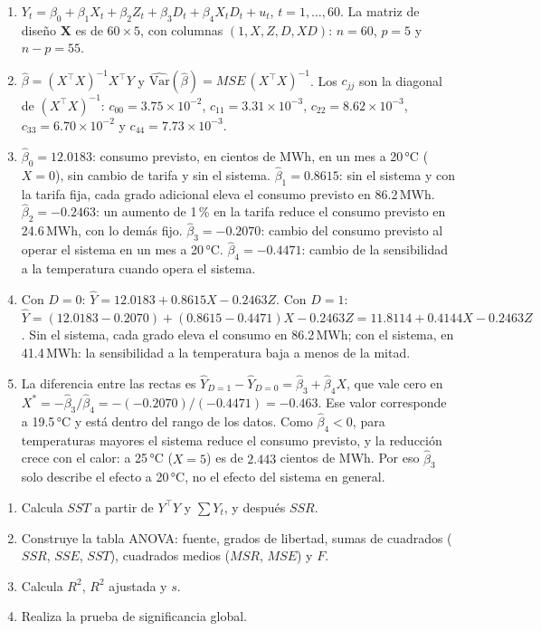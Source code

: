 \begin{solucion}
\begin{enumerate}
  \item $Y_t=\beta_0+\beta_1X_t+\beta_2Z_t+\beta_3D_t+\beta_4X_tD_t+u_t$, $t=1,\dots,60$. La matriz de diseño $\mathbf X$ es de $60\times5$, con columnas $(1,X,Z,D,XD)$: $n=60$, $p=5$ y $n-p=55$.
  \item $\hat\beta=(X^\top X)^{-1}X^\top Y$ y $\widehat{\mathrm{Var}}(\hat\beta)=MSE\,(X^\top X)^{-1}$. Los $c_{jj}$ son la diagonal de $(X^\top X)^{-1}$: $c_{00}=3.75\times10^{-2}$, $c_{11}=3.31\times10^{-3}$, $c_{22}=8.62\times10^{-3}$, $c_{33}=6.70\times10^{-2}$ y $c_{44}=7.73\times10^{-3}$.
  \item $\hat\beta_0=12.0183$: consumo previsto, en cientos de MWh, en un mes a 20\,°C ($X=0$), sin cambio de tarifa y sin el sistema. $\hat\beta_1=0.8615$: sin el sistema y con la tarifa fija, cada grado adicional eleva el consumo previsto en 86.2\,MWh. $\hat\beta_2=-0.2463$: un aumento de 1\,\% en la tarifa reduce el consumo previsto en 24.6\,MWh, con lo demás fijo. $\hat\beta_3=-0.2070$: cambio del consumo previsto al operar el sistema en un mes a 20\,°C. $\hat\beta_4=-0.4471$: cambio de la sensibilidad a la temperatura cuando opera el sistema.
  \item Con $D=0$: $\hat Y=12.0183+0.8615X-0.2463Z$. Con $D=1$: $\hat Y=(12.0183-0.2070)+(0.8615-0.4471)X-0.2463Z=11.8114+0.4144X-0.2463Z$. Sin el sistema, cada grado eleva el consumo en 86.2\,MWh; con el sistema, en 41.4\,MWh: la sensibilidad a la temperatura baja a menos de la mitad.
  \item La diferencia entre las rectas es $\hat Y_{D=1}-\hat Y_{D=0}=\hat\beta_3+\hat\beta_4X$, que vale cero en $X^*=-\hat\beta_3/\hat\beta_4=-(-0.2070)/(-0.4471)=-0.463$. Ese valor corresponde a 19.5\,°C y está dentro del rango de los datos. Como $\hat\beta_4<0$, para temperaturas mayores el sistema reduce el consumo previsto, y la reducción crece con el calor: a 25\,°C ($X=5$) es de $2.443$ cientos de MWh. Por eso $\hat\beta_3$ solo describe el efecto a 20\,°C, no el efecto del sistema en general.
\end{enumerate}
\end{solucion}

\begin{enumerate}
  \item Calcula $SST$ a partir de $Y^\top Y$ y $\sum Y_t$, y después $SSR$.
  \item Construye la tabla ANOVA: fuente, grados de libertad, sumas de cuadrados ($SSR$, $SSE$, $SST$), cuadrados medios ($MSR$, $MSE$) y $F$.
  \item Calcula $R^2$, $R^2$ ajustada y $s$.
  \item Realiza la prueba de significancia global.
\end{enumerate}


